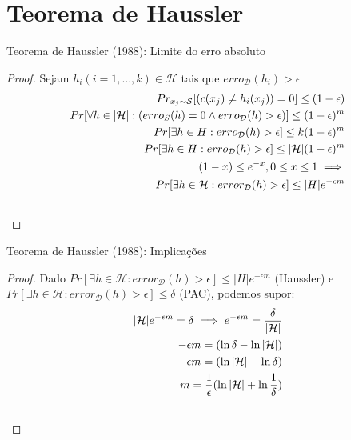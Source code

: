 \documentclass[10pt, professionalfonts]{beamer}
\begin{document}
{

  \AtBeginSection{}
  \section{Teorema de Haussler}
  \begin{frame}{Teorema de Haussler (1988): Limite do erro absoluto}
    \noindent{}
    \begin{proof}  Sejam $h_i (i = 1, ..., k) \in \mathcal{H}$ tais que $erro_{\mathcal{D}}(h_i)>\epsilon$
      \begin{align}
      Pr_{x_j\sim\mathcal{S}}[(c(x_j) \neq h_i(x_j))=0] \leq (1-\epsilon) \label{haussler:a} \\
      Pr[\forall h \in |\mathcal{H}|: (erro_{S}(h)=0 \land erro_{\mathcal{D}}(h)> \epsilon)] \leq (1-\epsilon)^m \label{haussler:b} \\
      Pr[\exists h \in H: erro_{\mathcal{D}}(h)>\epsilon]\leq k (1-\epsilon)^m \label{haussler:c} \\
      Pr[\exists h \in H: erro_{\mathcal{D}}(h)>\epsilon]\leq |\mathcal{H}| (1-\epsilon)^m \label{haussler:d} \\ 
      (1-x) \leq e^{-x}, 0 \leq x \leq 1 \implies \nonumber \\ Pr[\exists h \in \mathcal{H}: error_{\mathcal{D}}(h)>\epsilon]\leq |H|e^{-\epsilon m}  \label{haussler:e} \\
      \qedhere
      \end{align}
      \end{proof}
      

  \end{frame}
\begin{frame}{Teorema de Haussler (1988): Implicações}
  \noindent{}

\begin{proof}  Dado $Pr[\exists h \in \mathcal{H}: error_{\mathcal{D}}(h)>\epsilon]\leq |H|e^{-\epsilon m}$ (Haussler) e $Pr[\exists h \in \mathcal{H}: error_{\mathcal{D}}(h)>\epsilon]\leq \delta$ (PAC), podemos supor:
\begin{align}
    |\mathcal{H}|e^{-\epsilon m}=\delta \implies e^{-\epsilon m} = \frac{\delta}{|\mathcal{H}|} \\
    - \epsilon m = (\ln{\delta} - \ln{|\mathcal{H}|})  \\
    \epsilon m = (\ln{|\mathcal{H}|} - \ln{\delta}) \\
    m = \frac{1}{\epsilon}(\ln{|\mathcal{H}|} + \ln{\frac{1}{\delta}}) \\
    \qedhere
\end{align}
\end{proof}

\end{frame}
}
\end{document}
